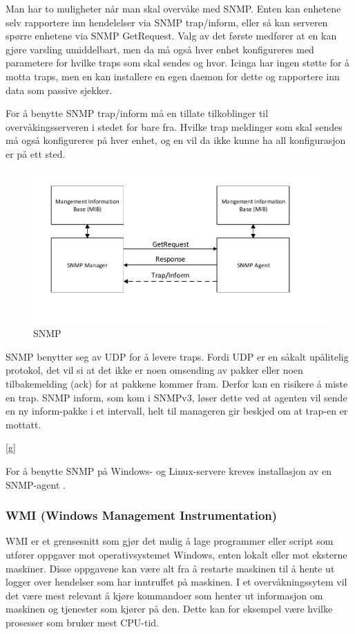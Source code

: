 Man har to muligheter når man skal overvåke med SNMP. Enten kan enhetene selv rapportere inn hendelelser via SNMP trap/inform, eller så kan serveren spørre enhetene via SNMP GetRequest. Valg av det første medfører at en kan gjøre varsling umiddelbart, men da må også hver enhet konfigureres med parametere for hvilke traps som skal sendes og hvor. Icinga har ingen støtte for å motta traps, men en kan installere en egen daemon for dette og rapportere inn data som passive sjekker. 

For å benytte SNMP trap/inform må en tillate tilkoblinger til overvåkingsserveren i stedet for bare fra. Hvilke trap meldinger som skal sendes må også konfigureres på hver enhet, og en vil da ikke kunne ha all konfigurasjon er på ett sted.


\begin{figure}
    \centralize
    \includegraphics{img/SNMP}
    \caption{SNMP}
    \label{SNMP}
\end{figure}


SNMP benytter seg av UDP for å levere traps. Fordi UDP er en såkalt upålitelig protokol, det vil si at det ikke er noen omsending av pakker eller noen tilbakemelding (ack) for at pakkene kommer fram. Derfor kan en risikere å miste en trap. SNMP inform, som kom i SNMPv3, løser dette ved at agenten vil sende en ny inform-pakke i et intervall, helt til manageren gir beskjed om at trap-en er mottatt.

[g]

For å benytte SNMP på Windows- og Linux-servere kreves installasjon av en SNMP-agent \cite{mssnmp} \cite{netsnmp}.

\subsubsection{WMI (Windows Management Instrumentation)}
WMI er et grensesnitt som gjør det mulig å lage programmer eller script som utfører oppgaver mot operativsystemet Windows, enten lokalt eller mot eksterne maskiner. Disse oppgavene kan være alt fra å restarte maskinen til å hente ut logger over hendelser som har inntruffet på maskinen. I et overvåkningssytem vil det være mest relevant å kjøre kommandoer som henter ut informasjon om maskinen og tjenester som kjører på den. Dette kan for eksempel være hvilke prosesser som bruker mest CPU-tid.

